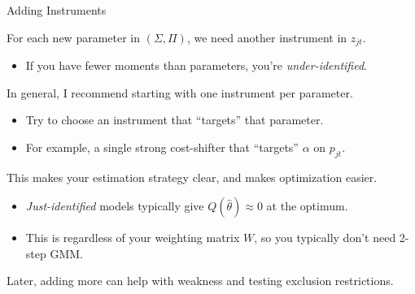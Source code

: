 \documentclass[aspectratio=169,t,11pt,table]{beamer}
\begin{document}
\begin{frame}{Adding Instruments}
    \begin{wideitemize}
        \item For each new parameter in $(\Sigma, \Pi)$, we need another instrument in $z_{jt}$.
        \begin{itemize}
            \item If you have fewer moments than parameters, you're \textit{under-identified}.
        \end{itemize}
        \pause
        \item In general, I recommend starting with one instrument per parameter.
        \begin{itemize}
            \item Try to choose an instrument that ``targets'' that parameter.
            \item For example, a single strong cost-shifter that ``targets'' $\alpha$ on $p_{jt}$.
        \end{itemize}
        \pause
        \item This makes your estimation strategy clear, and makes optimization easier.
        \begin{itemize}
            \item \textit{Just-identified} models typically give $Q(\hat{\theta}) \approx 0$ at the optimum.
            \item This is regardless of your weighting matrix $W$, so you typically don't need 2-step GMM.
        \end{itemize}
        \pause
        \item Later, adding more can help with weakness and testing exclusion restrictions. 
    \end{wideitemize}
\end{frame}
\end{document}
